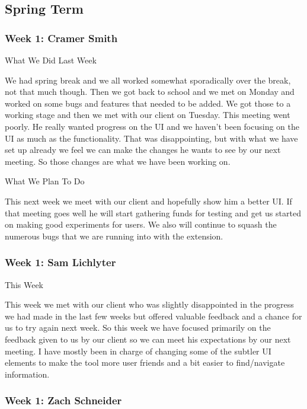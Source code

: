 \subsection{Spring Term}
 \subsubsection{Week 1: Cramer Smith}

What We Did Last Week



We had spring break and we all worked somewhat sporadically over the break, not that much though. Then we got back to school and we met on Monday and worked on some bugs and features that needed to be added. We got those to a working stage and then we met with our client on Tuesday. This meeting went poorly. He really wanted progress on the UI and we haven't been focusing on the UI as much as the functionality. That was disappointing, but with what we have set up already we feel we can make the changes he wants to see by our next meeting. So those changes are what we have been working on.



What We Plan To Do 



This next week we meet with our client and hopefully show him a better UI. If that meeting goes well he will start gathering funds for testing and get us started on making good experiments for users. We also will continue to squash the numerous bugs that we are running into with the extension. \\ 

 \subsubsection{Week 1: Sam Lichlyter}

This Week

This week we met with our client who was slightly disappointed in the progress we had made in the last few weeks but offered valuable feedback and a chance for us to try again next week. So this week we have focused primarily on the feedback given to us by our client so we can meet his expectations by our next meeting. I have mostly been in charge of changing some of the subtler UI elements to make the tool more user friends and a bit easier to find/navigate information. \\ 

 \subsubsection{Week 1: Zach Schneider}


